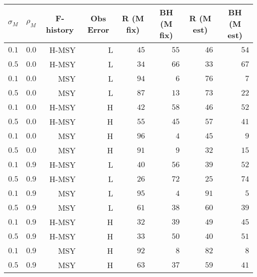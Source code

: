 \begin{center}
\begin{tabular}{rrrrrrrr}
\hline\hline
\multicolumn{1}{c}{$\sigma_M$}&\multicolumn{1}{c}{$\rho_M$}&\multicolumn{1}{c}{F-history}&\multicolumn{1}{c}{Obs Error}&\multicolumn{1}{c}{R (M fix)}&\multicolumn{1}{c}{BH (M fix)}&\multicolumn{1}{c}{R (M est)}&\multicolumn{1}{c}{BH (M est)}\tabularnewline
\hline
$0.1$&$0.0$&H-MSY&L&$45$&$55$&$46$&$54$\tabularnewline
$0.5$&$0.0$&H-MSY&L&$34$&$66$&$33$&$67$\tabularnewline
$0.1$&$0.0$&MSY&L&$94$&$ 6$&$76$&$ 7$\tabularnewline
$0.5$&$0.0$&MSY&L&$87$&$13$&$73$&$22$\tabularnewline
$0.1$&$0.0$&H-MSY&H&$42$&$58$&$46$&$52$\tabularnewline
$0.5$&$0.0$&H-MSY&H&$55$&$45$&$57$&$41$\tabularnewline
$0.1$&$0.0$&MSY&H&$96$&$ 4$&$45$&$ 9$\tabularnewline
$0.5$&$0.0$&MSY&H&$91$&$ 9$&$32$&$15$\tabularnewline
$0.1$&$0.9$&H-MSY&L&$40$&$56$&$39$&$52$\tabularnewline
$0.5$&$0.9$&H-MSY&L&$26$&$72$&$25$&$74$\tabularnewline
$0.1$&$0.9$&MSY&L&$95$&$ 4$&$91$&$ 5$\tabularnewline
$0.5$&$0.9$&MSY&L&$61$&$38$&$60$&$39$\tabularnewline
$0.1$&$0.9$&H-MSY&H&$32$&$39$&$49$&$45$\tabularnewline
$0.5$&$0.9$&H-MSY&H&$33$&$50$&$40$&$51$\tabularnewline
$0.1$&$0.9$&MSY&H&$92$&$ 8$&$82$&$ 8$\tabularnewline
$0.5$&$0.9$&MSY&H&$63$&$37$&$59$&$41$\tabularnewline
\hline
\end{tabular}\end{center}
